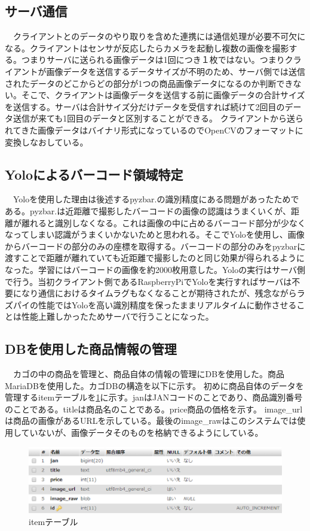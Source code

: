 \newpage

\subsection*{サーバ通信}
　クライアントとのデータのやり取りを含めた連携には通信処理が必要不可欠になる。クライアントはセンサが反応したらカメラを起動し複数の画像を撮影する。つまりサーバに送られる画像データは1回につき１枚ではない。つまりクライアントが画像データを送信するデータサイズが不明のため、サーバ側では送信されたデータのどこからどの部分が1つの商品画像データになるのか判断できない。そこで、クライアントは画像データを送信する前に画像データの合計サイズを送信する。サーバは合計サイズ分だけデータを受信すれば続けて2回目のデータ送信が来ても1回目のデータと区別することができる。
クライアントから送られてきた画像データはバイナリ形式になっているのでOpenCVのフォーマットに変換しなおしている。

\subsection*{Yoloによるバーコード領域特定}
　Yoloを使用した理由は後述するpyzbar\cite{pyzbar}.の識別精度にある問題があったためである。pyzbar\cite{pyzbar}.は近距離で撮影したバーコードの画像の認識はうまくいくが、距離が離れると識別しなくなる。これは画像の中に占めるバーコード部分が少なくなってしまい認識がうまくいかないためと思われる。そこでYoloを使用し、画像からバーコードの部分のみの座標を取得する。バーコードの部分のみをpyzbarに渡すことで距離が離れていても近距離で撮影したのと同じ効果が得られるようになった。学習にはバーコードの画像を約2000枚用意した。Yoloの実行はサーバ側で行う。当初クライアント側であるRaspberryPiでYoloを実行すればサーバは不要になり通信におけるタイムラグもなくなることが期待されたが、残念ながらラズパイの性能ではYoloを高い識別精度を保ったままリアルタイムに動作させることは性能上難しかったためサーバで行うことになった。

\subsection*{DBを使用した商品情報の管理}
　カゴの中の商品を管理と、商品自体の情報の管理にDBを使用した。商品MariaDBを使用した。カゴDBの構造を以下に示す。
初めに商品自体のデータを管理するitemテーブルを\ref{item_db}に示す。janはJANコードのことであり、商品識別番号のことである。titleは商品名のことである。price商品の価格を示す。
image\_urlは商品の画像があるURLを示している。最後のimage\_rawはこのシステムでは使用していないが、画像データそのものを格納できるようにしている。
\begin{figure}[htbp]
\centering
\includegraphics[width=15cm]{./pic/item_db.eps}
\caption{itemテーブル}
\label{item_db}
\end{figure}


